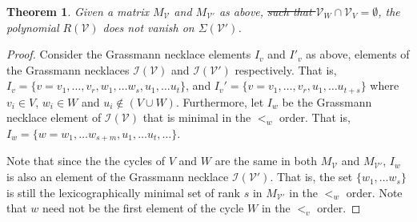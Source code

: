 \documentclass[11pt]{article}
\newcommand{\cV}{\mathcal{V}}
\newcommand{\cI}{\mathcal{I}}
\newtheorem{thm}{Theorem}[section]
\theoremstyle{remark}
\theoremstyle{definition}
\begin{document}
\begin{thm}
Given a matrix $M_{\cV}$ and $M_{\cV'}$ as above, \st{such that $\cV_W \cap \cV_V = \emptyset$}, the polynomial $R(\cV)$ does not vanish on $\Sigma(\cV')$. 
\end{thm} 

\begin{proof}
Consider the Grassmann necklace elements $I_v$ and $I'_v$ as above, elements of the Grassmann necklaces $\cI(\cV)$ and $\cI(\cV')$ respectively. That is, $I_v =  \{v = v_1, \ldots, v_r, w_1, \ldots w_s, u_1, \ldots u_t\}$, and $I_v' =  \{v = v_1, \ldots, v_r, u_1, \ldots u_{t+s}\}$ where $v_i \in V$, $w_i \in W$ and $u_i \not \in (V \cup W)$. Furthermore, let $I_w$ be the Grassmann necklace element of $\cI(\cV)$ that is minimal in the $<_w$ order. That is, $I_w =  \{ w = w_1, \ldots w_{s+m}, u_1, \ldots u_t, \ldots \}$. 

Note that since the the cycles of $V$ and $W$ are the same in both $M_{\cV}$ and $M_{\cV'}$, $I_w$ is also an element of the Grassmann necklace $\cI(\cV')$. That is, the set $\{ w_1, \ldots w_s\}$ is still the lexicographically minimal set of rank $s$ in $M_{\cV'}$ in the $<_w$ order. Note that $w$ need not be the first element of the cycle $W$ in the $<_v$ order. 


\end{proof}
\end{document}
